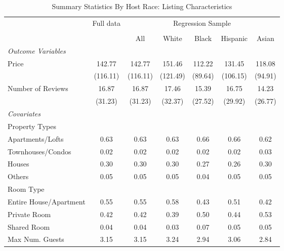 \begin{table}[htbp]
\caption{Summary Statistics By Host Race: Listing Characteristics}
\begin{center}%
\small\begin{tabular}{l c | c | c c c c}
\hline
& \multicolumn{1}{c}{Full data} & \multicolumn{5}{c}{Regression Sample}
\\
 \cmidrule(r){3-7}
\\
 & \multicolumn{1}{c}{} & \multicolumn{1}{c}{All} & White & Black & Hispanic & Asian
\\
\hline\hline\noalign{\smallskip} 
 \textit{\textit{Outcome Variables}} & & & & & & \\ Price & 142.77 & 142.77 & 151.46 & 112.22 & 131.45 & 118.08 \\
 & (116.11) & (116.11) & (121.49) & (89.64) & (106.15) & (94.91) \\
 Number of Reviews & 16.87 & 16.87 & 17.46 & 15.39 & 16.75 & 14.23 \\
 & (31.23) & (31.23) & (32.37) & (27.52) & (29.92) & (26.77) \\
 \textit{Covariates} & & & & & & \\ \hline Property Types & & & & & & \\ \hspace{10bp}Apartments/Lofts    & 0.63 & 0.63 & 0.63 & 0.66 & 0.66 & 0.62 \\ \hspace{10bp}Townhouses/Condos   & 0.02 & 0.02 & 0.02 & 0.02 & 0.02 & 0.03 \\ \hspace{10bp}Houses                      & 0.30 & 0.30 & 0.30 & 0.27 & 0.26 & 0.30 \\ \hspace{10bp}Others                              & 0.05 & 0.05 & 0.05 & 0.04 & 0.05 & 0.05 \\Room Type &&&&&& \\ \hspace{10bp}Entire House/Apartment      & 0.55 & 0.55 & 0.58 & 0.43 & 0.51 & 0.42 \\ \hspace{10bp}Private Room                        & 0.42 & 0.42 & 0.39 & 0.50 & 0.44 & 0.53 \\ \hspace{10bp}Shared Room                         & 0.04 & 0.04 & 0.03 & 0.07 & 0.05 & 0.05 \\ Max Num. Guests & 3.15 & 3.15 & 3.24 & 2.94 & 3.06 & 2.84 \\

\end{tabular}
\end{center}
\end{table}
